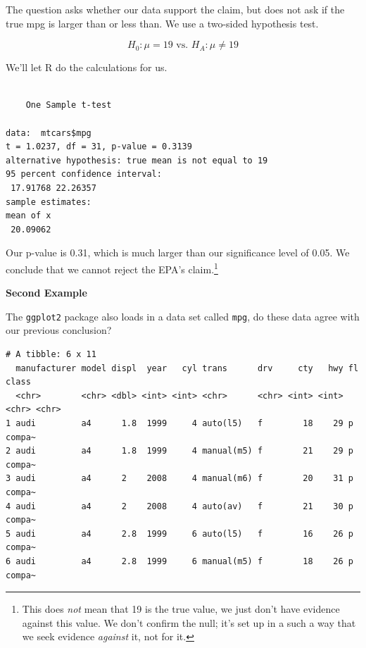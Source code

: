 \documentclass[
  letterpaper,
  DIV=11,
  numbers=noendperiod,
  oneside]{scrreprt}
\newenvironment{Shaded}{\begin{snugshade}}{\end{snugshade}}
\newcommand{\AttributeTok}[1]{\textcolor[rgb]{0.40,0.45,0.13}{#1}}
\newcommand{\DecValTok}[1]{\textcolor[rgb]{0.68,0.00,0.00}{#1}}
\newcommand{\FunctionTok}[1]{\textcolor[rgb]{0.28,0.35,0.67}{#1}}
\newcommand{\NormalTok}[1]{\textcolor[rgb]{0.00,0.23,0.31}{#1}}
\newcommand{\SpecialCharTok}[1]{\textcolor[rgb]{0.37,0.37,0.37}{#1}}
\newcommand{\StringTok}[1]{\textcolor[rgb]{0.13,0.47,0.30}{#1}}
\begin{document}
The question asks whether our data support the claim, but does not ask
if the true mpg is larger than or less than. We use a two-sided
hypothesis test.

\[
H_0: \mu = 19\text{ vs. }H_A:\mu \ne 19
\]

We'll let R do the calculations for us.

\begin{Shaded}
\end{Shaded}

\begin{verbatim}

    One Sample t-test

data:  mtcars$mpg
t = 1.0237, df = 31, p-value = 0.3139
alternative hypothesis: true mean is not equal to 19
95 percent confidence interval:
 17.91768 22.26357
sample estimates:
mean of x 
 20.09062 
\end{verbatim}

Our p-value is 0.31, which is much larger than our significance level of
0.05. We conclude that we cannot reject the EPA's claim.\footnote{This
  does \emph{not} mean that 19 is the true value, we just don't have
  evidence against this value. We don't confirm the null; it's set up in
  a such a way that we seek evidence \emph{against} it, not for it.}

\textbf{Second Example}

The \texttt{ggplot2} package also loads in a data set called
\texttt{mpg}, do these data agree with our previous conclusion?

\begin{verbatim}
# A tibble: 6 x 11
  manufacturer model displ  year   cyl trans      drv     cty   hwy fl    class 
  <chr>        <chr> <dbl> <int> <int> <chr>      <chr> <int> <int> <chr> <chr> 
1 audi         a4      1.8  1999     4 auto(l5)   f        18    29 p     compa~
2 audi         a4      1.8  1999     4 manual(m5) f        21    29 p     compa~
3 audi         a4      2    2008     4 manual(m6) f        20    31 p     compa~
4 audi         a4      2    2008     4 auto(av)   f        21    30 p     compa~
5 audi         a4      2.8  1999     6 auto(l5)   f        16    26 p     compa~
6 audi         a4      2.8  1999     6 manual(m5) f        18    26 p     compa~
\end{verbatim}
\end{document}
